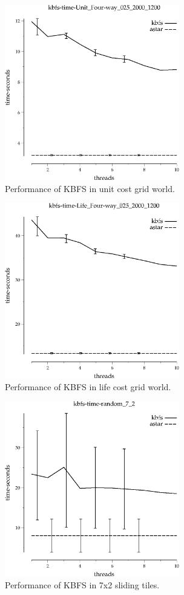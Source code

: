 \documentclass{article}
\begin{document}
\begin{figure}[h!]
\includegraphics[width=3in]{../graphs/seth/grid-unit-single/KBFS.eps}
\caption{Performance of KBFS in unit cost grid world.}
\label{fig:KBFS-grid}
\end{figure}

\begin{figure}[h!]
\includegraphics[width=3in]{../graphs/seth/grid-life-single/KBFS.eps}
\caption{Performance of KBFS in life cost grid world.}
\label{fig:KBFS-life}
\end{figure}

\begin{figure}[h!]
\includegraphics[width=3in]{../graphs/seth/tiles-single/KBFS.eps}
\caption{Performance of KBFS in 7x2 sliding tiles.}
\label{fig:KBFS-life}
\end{figure}
\end{document}
